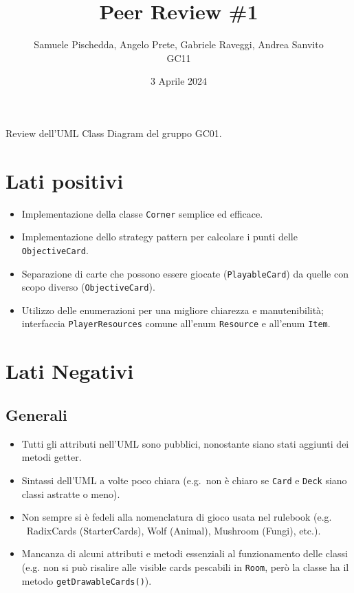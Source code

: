 \documentclass{article}
\title{Peer Review \#1}
\author{Samuele Pischedda, Angelo Prete, Gabriele Raveggi, Andrea Sanvito\\GC11}
\date{3 Aprile 2024}
\begin{document}
\maketitle

Review dell'UML Class Diagram del gruppo GC01.

\section{Lati positivi}

\begin{itemize}
  \item Implementazione della classe \texttt{Corner} semplice ed efficace.
  \item Implementazione dello strategy pattern per calcolare i punti delle \\\texttt{ObjectiveCard}.
  \item Separazione di carte che possono essere giocate (\texttt{PlayableCard}) da quelle con scopo diverso (\texttt{ObjectiveCard}).
  \item Utilizzo delle enumerazioni per una migliore chiarezza e manutenibilità; interfaccia \texttt{PlayerResources} comune all'enum \texttt{Resource} e all'enum \texttt{Item}.
\end{itemize}

\section{Lati Negativi}
\subsection{Generali}

\begin{itemize}
  \item Tutti gli attributi nell'UML sono pubblici, nonostante siano stati aggiunti dei metodi getter.
  \item Sintassi dell'UML a volte poco chiara (e.g.~non è chiaro se \texttt{Card} e \texttt{Deck} siano classi astratte o meno).
  \item Non sempre si è fedeli alla nomenclatura di gioco usata nel rulebook (e.g. ~RadixCards (StarterCards), Wolf (Animal), Mushroom (Fungi), etc.).
  \item Mancanza di alcuni attributi e metodi essenziali al funzionamento delle classi (e.g. non si può risalire alle visible cards pescabili in \texttt{Room}, però la classe ha il metodo \texttt{getDrawableCards()}).
\end{itemize}
\end{document}
